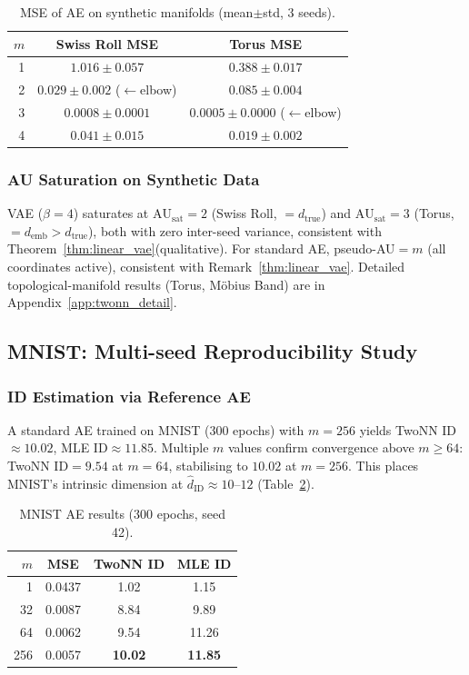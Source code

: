\documentclass[11pt,a4paper]{article}
\newcommand{\AUsat}{\mathrm{AU}_{\mathrm{sat}}}
\newcommand{\hatdID}{\hat{d}_{\mathrm{ID}}}
\begin{document}
\begin{table}[ht]
\centering
\caption{MSE of AE on synthetic manifolds (mean$\pm$std, 3 seeds).}
\label{tab:e1}
\small
\begin{tabular}{rcc}
\toprule
$m$ & Swiss Roll MSE & Torus MSE \\
\midrule
1 & $1.016\pm0.057$ & $0.388\pm0.017$ \\
2 & $\boldsymbol{0.029\pm0.002}$ ($\leftarrow$elbow) & $0.085\pm0.004$ \\
3 & $0.0008\pm0.0001$ & $\boldsymbol{0.0005\pm0.0000}$ ($\leftarrow$elbow) \\
4 & $0.041\pm0.015$ & $0.019\pm0.002$ \\
\bottomrule
\end{tabular}
\end{table}

\subsubsection{AU Saturation on Synthetic Data}

VAE ($\beta=4$) saturates at $\AUsat=2$ (Swiss Roll, $=d_{\mathrm{true}}$) and
$\AUsat=3$ (Torus, $=d_{\mathrm{emb}}>d_{\mathrm{true}}$), both with zero
inter-seed variance, consistent with Theorem~\ref{thm:linear_vae}(qualitative).
For standard AE, pseudo-AU$=m$ (all coordinates active), consistent with
Remark~\ref{thm:linear_vae}.
Detailed topological-manifold results (Torus, Möbius Band) are in
Appendix~\ref{app:twonn_detail}.

\subsection{MNIST: Multi-seed Reproducibility Study}\label{sec:exp_mnist}

\subsubsection{ID Estimation via Reference AE}

A standard AE trained on MNIST (300 epochs) with $m=256$ yields
TwoNN ID$\approx10.02$, MLE ID$\approx11.85$.
Multiple $m$ values confirm convergence above $m\geq64$:
TwoNN ID$=9.54$ at $m=64$, stabilising to $10.02$ at $m=256$.
This places MNIST's intrinsic dimension at $\hatdID\approx10$--$12$
(Table~\ref{tab:e4_ae}).

\begin{table}[ht]
\centering
\caption{MNIST AE results (300 epochs, seed 42).}
\label{tab:e4_ae}
\small
\begin{tabular}{rccc}
\toprule
$m$ & MSE & TwoNN ID & MLE ID \\
\midrule
1   & 0.0437 & 1.02  & 1.15  \\
32  & 0.0087 & 8.84  & 9.89  \\
64  & 0.0062 & 9.54  & 11.26 \\
256 & 0.0057 & \textbf{10.02} & \textbf{11.85} \\
\bottomrule
\end{tabular}
\end{table}
\end{document}
